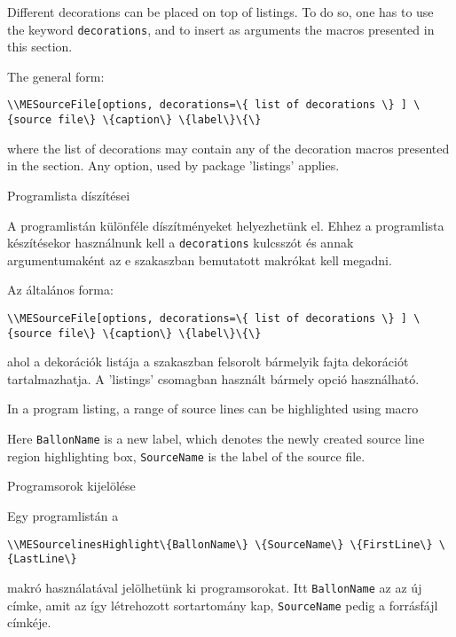 {
Different decorations can be placed on top of listings.
To do so, one has to use the keyword  \lstinline|decorations|,
and to insert as arguments the macros presented in this section.

The general form:
\par\noindent\lstinline|\\MESourceFile[options,
decorations=\{
list of decorations
\}
] \{source file\} \{caption\} \{label\}\{\}|
\par\noindent where the list of decorations may contain any of the 
decoration macros presented in the section.
Any option, used by package 'listings' applies.
}
{Programlista díszítései}
{
A programlistán különféle díszítményeket helyezhetünk el.
Ehhez a programlista készítésekor használnunk kell a \lstinline|decorations| kulcsszót
és annak argumentumaként az e szakaszban bemutatott makrókat kell megadni.

Az általános forma:
\par\noindent\lstinline|\\MESourceFile[options,
decorations=\{
list of decorations
\}
] \{source file\} \{caption\} \{label\}\{\}|
\par\noindent ahol a dekorációk listája a szakaszban felsorolt 
bármelyik fajta dekorációt tartalmazhatja.
A 'listings' csomagban használt bármely opció használható.
}


{
In a program listing, a range of source lines can be highlighted using macro 
\par\noindent Here  \lstinline|BallonName| is a new label, which denotes the 
newly created source line region highlighting box, \lstinline|SourceName| 
is the label of the source file. 
}
{Programsorok kijelölése}
{
Egy programlistán a
\par\noindent\lstinline|\\MESourcelinesHighlight\{BallonName\} \{SourceName\} \{FirstLine\} \{LastLine\}|
\par\noindent makró használatával jelölhetünk ki programsorokat. Itt \lstinline|BallonName|
az az új címke, amit az így létrehozott sortartomány kap, \lstinline|SourceName| pedig a
forrásfájl címkéje. 
}

